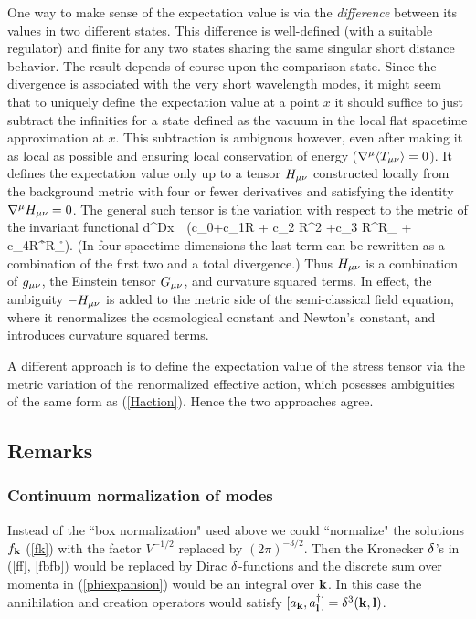 \documentclass[12pt]{article}
\begin{document}
One way to make sense of the expectation value is 
via the {\it difference} between its values in two different states.
This difference is well-defined (with a suitable
regulator) and finite for any two states sharing the 
same singular short distance behavior. The result depends of course
upon the comparison state.
Since the divergence is associated with the 
very short wavelength modes, it might seem that to
uniquely define the expectation value at a point $x$ it should
suffice to just subtract the infinities for a state
defined as the vacuum in the local flat spacetime 
approximation at $x$.
This subtraction is ambiguous however, 
even after making it as local as
possible and ensuring local conservation of energy
($\nabla^\mu \langle T_{\mu\nu}\rangle=0$). 
It defines the expectation value only up to a 
tensor $H_{\mu\nu}$ constructed locally from the 
background metric with four or fewer derivatives
and satisfying the identity $\nabla^\mu H_{\mu\nu}=0$.
The general such tensor is the variation with respect
to the metric of the invariant functional
%
\beq \int d^Dx\, \, \Bigl(c_0+c_1R + c_2 R^2 +c_3
R^{\m\n}R_{\m\n} + c_4R^{\m\n\r\s}R_{\m\n\r\s}\Bigr).
\label{Haction}
\eeq
%
(In four spacetime dimensions the last term can be rewritten 
as a combination of the first two and a total divergence.) 
Thus $H_{\mu\nu}$ is a combination of $g_{\mu\nu}$, the 
Einstein tensor $G_{\mu\nu}$, and curvature squared terms.
In effect, the ambiguity $-H_{\mu\nu}$ is added to the metric side of the semi-classical field equation, where it renormalizes the cosmological constant and Newton's constant, and introduces curvature squared terms.  

A different approach is to define the expectation value
of the stress tensor via the metric variation of the renormalized 
effective action, which posesses ambiguities of the same form as (\ref{Haction}). Hence the two approaches agree. 


\subsection{Remarks}

\subsubsection{Continuum normalization of modes}
Instead of the ``box normalization" used above 
we could ``normalize"  the solutions $f_{\bf k}$ (\ref{fk})
with the factor $V^{-1/2}$ replaced by $(2\pi)^{-3/2}$. 
Then the Kronecker $\delta$'s  in
(\ref{ff}, \ref{fbfb}) 
would be replaced by Dirac $\delta$-functions and 
the discrete sum over momenta in (\ref{phiexpansion}) 
would be an integral over ${\bf k}$. In this case the
annihilation and creation operators would satisfy 
$[a_{\bf k},a^\dagger_{{\bf l}}]=\delta^3({\bf k},{\bf l})$.
\end{document}
